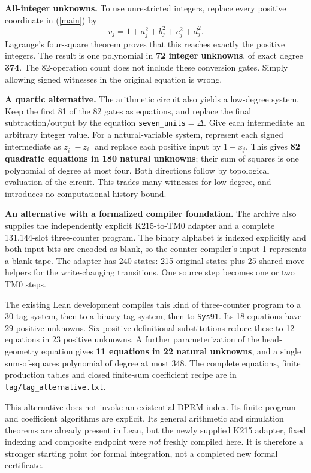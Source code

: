 \documentclass[10pt]{article}
\newcommand{\code}[1]{\texttt{#1}}
\begin{document}
\textbf{All-integer unknowns.} To use unrestricted integers, replace every positive coordinate in (\ref{main}) by
\[
v_j=1+a_j^2+b_j^2+c_j^2+d_j^2.
\]
Lagrange's four-square theorem proves that this reaches exactly the positive integers. The result is one polynomial in \textbf{72 integer unknowns}, of exact degree \textbf{374}. The 82-operation count does not include these conversion gates. Simply allowing signed witnesses in the original equation is wrong.

\textbf{A quartic alternative.} The arithmetic circuit also yields a low-degree system. Keep the first 81 of the 82 gates as equations, and replace the final subtraction/output by the equation \code{seven\_units}$=\Delta$. Give each intermediate an arbitrary integer value. For a natural-variable system, represent each signed intermediate as $z_i^+-z_i^-$ and replace each positive input by $1+x_j$. This gives \textbf{82 quadratic equations in 180 natural unknowns}; their sum of squares is one polynomial of degree at most four. Both directions follow by topological evaluation of the circuit. This trades many witnesses for low degree, and introduces no computational-history bound.

\textbf{An alternative with a formalized compiler foundation.} The archive also supplies the independently explicit K215-to-TM0 adapter and a complete 131,144-slot three-counter program. The binary alphabet is indexed explicitly and both input bits are encoded as blank, so the counter compiler's input 1 represents a blank tape. The adapter has 240 states: 215 original states plus 25 shared move helpers for the write-changing transitions. One source step becomes one or two TM0 steps.

The existing Lean development compiles this kind of three-counter program to a 30-tag system, then to a binary tag system, then to \code{Sys91}. Its 18 equations have 29 positive unknowns. Six positive definitional substitutions reduce these to 12 equations in 23 positive unknowns. A further parameterization of the head-geometry equation gives \textbf{11 equations in 22 natural unknowns}, and a single sum-of-squares polynomial of degree at most 348. The complete equations, finite production tables and closed finite-sum coefficient recipe are in \code{tag/tag\_alternative.txt}.

This alternative does not invoke an existential DPRM index. Its finite program and coefficient algorithms are explicit. Its general arithmetic and simulation theorems are already present in Lean, but the newly supplied K215 adapter, fixed indexing and composite endpoint were \emph{not} freshly compiled here. It is therefore a stronger starting point for formal integration, not a completed new formal certificate.
\newpage
\end{document}
